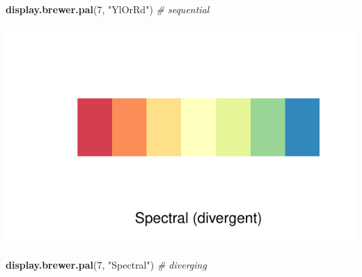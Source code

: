 \documentclass[]{tufte-handout}
\newenvironment{Shaded}{\begin{snugshade}}{\end{snugshade}}
\newcommand{\CommentTok}[1]{\textcolor[rgb]{0.56,0.35,0.01}{\textit{#1}}}
\newcommand{\DecValTok}[1]{\textcolor[rgb]{0.00,0.00,0.81}{#1}}
\newcommand{\KeywordTok}[1]{\textcolor[rgb]{0.13,0.29,0.53}{\textbf{#1}}}
\newcommand{\NormalTok}[1]{#1}
\newcommand{\StringTok}[1]{\textcolor[rgb]{0.31,0.60,0.02}{#1}}
\begin{document}
\begin{Shaded}
\begin{Highlighting}[]
\KeywordTok{display.brewer.pal}\NormalTok{(}\DecValTok{7}\NormalTok{, }\StringTok{"YlOrRd"}\NormalTok{)  }\CommentTok{# sequential}
\end{Highlighting}
\end{Shaded}

\begin{marginfigure}
\includegraphics{design_files/figure-latex/unnamed-chunk-4-1} \end{marginfigure}

\begin{Shaded}
\begin{Highlighting}[]
\KeywordTok{display.brewer.pal}\NormalTok{(}\DecValTok{7}\NormalTok{, }\StringTok{"Spectral"}\NormalTok{)  }\CommentTok{# diverging}
\end{Highlighting}
\end{Shaded}
\end{document}
